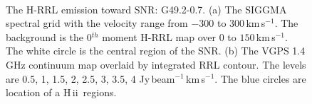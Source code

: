 \documentclass[manuscript]{aastex61}
\newcommand{\hii}{{\rm H\,}{{\sc ii}}}
\newcommand{\kms}{\,km\,s$^{-1}$}
\begin{document}
\begin{figure}[H]
	\centering
	\\
	\caption{The H-RRL emission toward SNR: G49.2-0.7.
	(a) The SIGGMA spectral grid with the velocity range from $-300$ to $300$\kms.
	The background is the 0$^{th}$ moment H-RRL map over $0$ to $150$\kms.
	The white circle is the central region of the SNR.
	(b) The VGPS 1.4 GHz continuum map overlaid by integrated RRL contour.
	The levels are 0.5, 1, 1.5, 2, 2.5, 3, 3.5, 4 Jy\,beam$^{-1}$\kms.
	The blue circles are location of a \hii\ regions.
	}
	\label{fig_snr-g492}
\end{figure}
\end{document}
